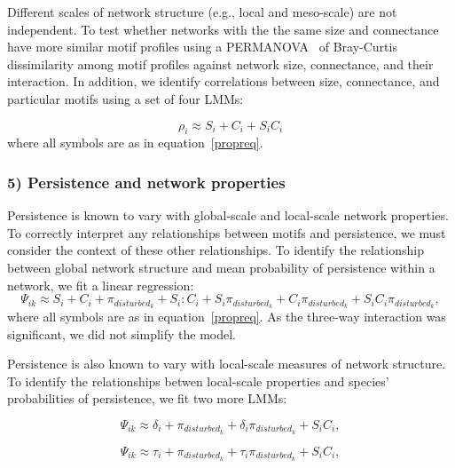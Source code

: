 \documentclass[12pt]{article}
\begin{document}
\begin{spacing}{2.0}
        Different scales of network structure (e.g., local and meso-scale) are not independent. 
        To test whether networks with the the same size and connectance have more similar motif profiles using a PERMANOVA~\citep{Anderson2001} of Bray-Curtis dissimilarity among motif profiles against network size, connectance, and their interaction. 
        In addition, we identify correlations between size, connectance, and particular motifs using a set of four LMMs:
        
        \begin{equation}
            \rho_{i} \approx S_{i} + C_{i} + S_{i}C_{i}
        \end{equation}
        where all symbols are as in equation~\ref{propreq}.
        
    \subsubsection*{5) Persistence and network properties}
        
        Persistence is known to vary with global-scale and local-scale network properties.
        To correctly interpret any relationships between motifs and persistence, we must consider the context of these other relationships.
        To identify the relationship between global network structure and mean probability of persistence within a network, we fit a linear regression:
            \begin{equation}
                \Psi_{ik} \approx S_{i} + C_{i} + \pi_{disturbed_k} + S_{i}:C_{i} + S_{i}\pi_{disturbed_k} + C_{i}\pi_{disturbed_k} + S_{i}C_{i}\pi_{disturbed_k},
                \label{SCeq}
            \end{equation}
        where all symbols are as in equation~\ref{propreq}.
        As the three-way interaction was significant, we did not simplify the model. 


        Persistence is also known to vary with local-scale measures of network structure. 
        To identify the relationships betwen local-scale properties and species' probabilities of persistence, we fit two more LMMs:
        
        \begin{equation}
                \Psi_{ik} \approx \delta_{i} + \pi_{disturbed_k} + \delta_{i}\pi_{disturbed_k} +
                S_{i}C_{i} ,
                \label{degeq}
            \end{equation}
    
        \begin{equation}
                \Psi_{ik} \approx \tau_{i} + \pi_{disturbed_k} + \tau_{i}\pi_{disturbed_k} +
                S_{i}C_{i} ,
                \label{TLeq}
            \end{equation}
    

\end{spacing}
\end{document}
